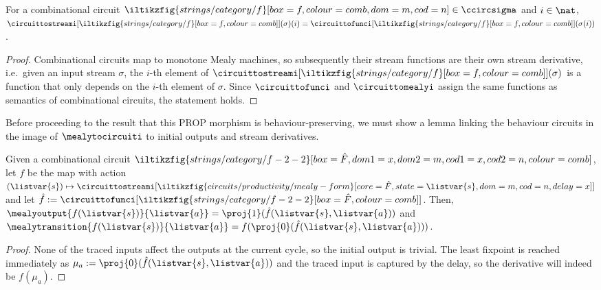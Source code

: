\begin{lemma}\label{lem:combinational-streams}
    For a combinational circuit \(
        \iltikzfig{strings/category/f}[box=f,colour=comb,dom=m,cod=n]
        \in \ccircsigma
    \) and \(i \in \nat\), \(
        \circuittostreami[
            \iltikzfig{strings/category/f}[box=f,colour=comb]
        ](\sigma)(i)
        =
        \circuittofunci[
            \iltikzfig{strings/category/f}[box=f,colour=comb]
        ](\sigma(i))
    \).
\end{lemma}
\begin{proof}
    Combinational circuits map to monotone Mealy machines, so subsequently
    their stream functions are their own stream derivative, i.e.\ given an
    input stream \(\sigma\), the \(i\)-th element of \(
        \circuittostreami[
            \iltikzfig{strings/category/f}[box=f,colour=comb]
        ](\sigma)
    \) is a function that only depends on the \(i\)-th element of \(\sigma\).
    Since \(\circuittofunci\) and \(\circuittomealyi\) assign the same functions
    as semantics of combinational circuits, the statement holds.
\end{proof}

Before proceeding to the result that this PROP morphism is behaviour-preserving,
we must show a lemma linking the behaviour circuits in the image of
\(\mealytocircuiti\) to initial outputs and stream derivatives.

\begin{proposition}
    \label{prop:mealy-form-image}
    Given a combinational circuit \(
        \iltikzfig{strings/category/f-2-2}[box=\hat{F},dom1=x,dom2=m,cod1=x,cod2=n,colour=comb]
    \), let \(f\) be the map with action \(
        (\listvar{s}) \mapsto
            \circuittostreami[
                \iltikzfig{circuits/productivity/mealy-form}[core=\hat{F},state=\listvar{s},dom=m,cod=n,delay=x]
            ]
    \) and let \(
        \hat{f}
        :=
        \circuittofunci[
            \iltikzfig{strings/category/f-2-2}[box=\hat{F},colour=comb]
        ]
    \).
    Then, \(
        \mealyoutput{f(\listvar{s})}{\listvar{a}}
        =
        \proj{1}(\hat{f}(\listvar{s}, \listvar{a}))
    \) and \(
        \mealytransition{f(\listvar{s})}{\listvar{a}}
        =
        f(\proj{0}(\hat{f}(\listvar{s}, \listvar{a})))
    \).
\end{proposition}
\begin{proof}
    None of the traced inputs affect the outputs at the
    current cycle, so the initial output is trivial.
    The least fixpoint is reached immediately as \(
        \mu_a := \proj{0}(\hat{f}(\listvar{s}, \listvar{a}))
    \) and the traced input is captured by the delay, so the derivative
    will indeed be \(f(\mu_a)\).
\end{proof}

